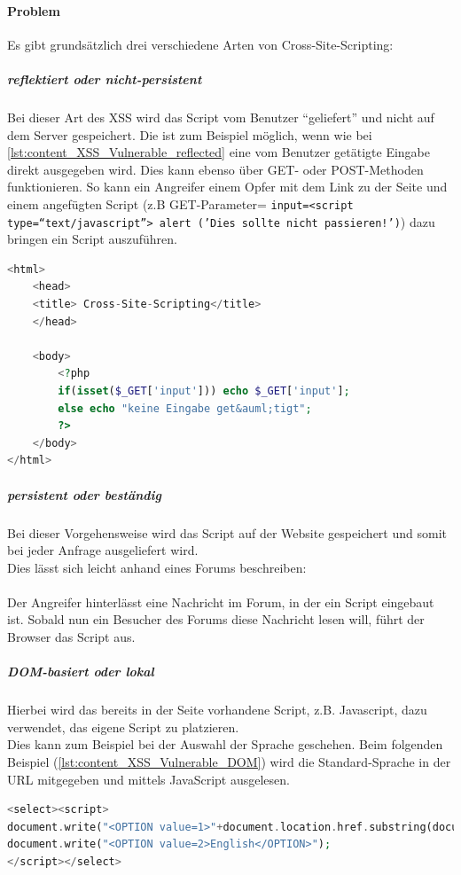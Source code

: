 \paragraph{Problem}
Es gibt grundsätzlich drei verschiedene Arten von Cross-Site-Scripting:
\subparagraph{reflektiert oder nicht-persistent}
Bei dieser Art des XSS wird das Script vom Benutzer \enquote{geliefert} und nicht auf dem Server gespeichert. Die ist zum Beispiel möglich, wenn wie bei \autoref{lst:content_XSS_Vulnerable_reflected} eine vom Benutzer getätigte Eingabe direkt ausgegeben wird. Dies kann ebenso über GET- oder POST-Methoden funktionieren. So kann ein Angreifer einem Opfer mit dem Link zu der Seite und einem angefügten Script (z.B GET-Parameter= \texttt{input=<script type=\enquote{text/javascript}> alert ('Dies sollte nicht passieren!')}) dazu bringen ein Script auszuführen.
\begin{lstlisting}[style=custom, language=PHP, caption={ reflektiertes Cross-Site-Scripting Anfällig},label={lst:content_XSS_Vulnerable_reflected}]
<html>
	<head>
	<title> Cross-Site-Scripting</title>
	</head>

	<body>
		<?php
		if(isset($_GET['input'])) echo $_GET['input'];
		else echo "keine Eingabe get&auml;tigt";			
		?>
	</body>
</html>
\end{lstlisting}
\subparagraph{persistent oder beständig}
Bei dieser Vorgehensweise wird das Script auf der Website gespeichert und somit bei jeder Anfrage ausgeliefert wird. \\ Dies lässt sich leicht anhand eines Forums beschreiben:\\\\
Der Angreifer hinterlässt eine Nachricht im Forum, in der ein Script eingebaut ist. Sobald nun ein Besucher des Forums diese Nachricht lesen will, führt der Browser das Script aus.
\subparagraph{DOM-basiert oder lokal}
Hierbei wird das bereits in der Seite vorhandene Script, z.B. Javascript, dazu verwendet, das eigene Script zu platzieren.\\
Dies kann zum Beispiel bei der Auswahl der Sprache geschehen. Beim folgenden Beispiel (\autoref{lst:content_XSS_Vulnerable_DOM}) wird die Standard-Sprache in der URL mitgegeben und mittels JavaScript ausgelesen.
\begin{lstlisting}[style=custom, language=PHP, caption={DOM-Cross-Site-Scripting Anfällig},label={lst:content_XSS_Vulnerable_DOM}]
<select><script>
document.write("<OPTION value=1>"+document.location.href.substring(document.location.href.indexOf("default=")+8)+"</OPTION>");
document.write("<OPTION value=2>English</OPTION>");
</script></select>
\end{lstlisting}

